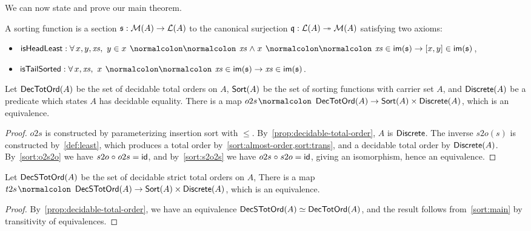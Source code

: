\noindent
We can now state and prove our main theorem.
\begin{definition}
    \label{def:sorting-function}
    \leavevmode
    A sorting function is a section $\mathfrak{s} : \mathcal{M}(A) \to \mathcal{L}(A)$ to
    the canonical surjection $\mathfrak{q} : \mathcal{L}(A) \twoheadrightarrow \mathcal{M}(A)$ satisfying two axioms:
    \begin{itemize}[leftmargin=*]
        \item $\isheadleast :
                  \forall\, x, y, \xs,\,\,
                  y \in x \cons \xs \mathrel{\land} \inimage{x \cons \xs} \to \inimage{[x, y]}
              $,
        \item $\istailsort :
                  \forall\, x, \xs,\,\,
                  \inimage{x \cons \xs} \to \inimage{\xs}
              $.
    \end{itemize}
\end{definition}
\begin{theorem}
    \label{sort:main}
    Let $\operatorname{\mathsf{DecTotOrd}}(A)$ be the set of decidable total orders on $A$,
    $\operatorname{\mathsf{Sort}}(A)$ be the set of sorting functions with carrier set $A$,
    and $\operatorname{\mathsf{Discrete}}(A)$ be a predicate which states $A$ has decidable equality.
    There is a map $o2s \colon \term{DecTotOrd}(A) \to \term{Sort}(A) \times \term{Discrete}(A)$,
    which is an equivalence.
\end{theorem}
\begin{proof}
    $o2s$ is constructed by parameterizing insertion sort with $\leq$.
    By~\cref{prop:decidable-total-order}, $A$ is $\operatorname{\mathsf{Discrete}}$.
    The inverse $s2o(s)$ is constructed by~\cref{def:least}, which produces
    a total order by~\cref{sort:almost-order,sort:trans},
    and a decidable total order by $\operatorname{\mathsf{Discrete}}(A)$.
    By~\cref{sort:o2s2o} we have $s2o \comp o2s \id \idfunc$,
    and by~\cref{sort:s2o2s} we have $o2s \comp s2o \id \idfunc$,
    giving an isomorphism, hence an equivalence.
\end{proof}

\begin{corollary}
    \label{sort:strict-order}
    Let $\operatorname{\mathsf{DecSTotOrd}}(A)$ be the set of decidable strict total orders on $A$,
    There is a map $t2s \colon \term{DecSTotOrd}(A) \to \term{Sort}(A) \times \term{Discrete}(A)$,
    which is an equivalence.
\end{corollary}
\begin{proof}
    By~\cref{prop:decidable-total-order}, we have an equivalence
    $\operatorname{\mathsf{DecSTotOrd}}(A) \simeq \operatorname{\mathsf{DecTotOrd}}(A)$, and the result follows from~\cref{sort:main}
    by transitivity of equivalences.
\end{proof}

